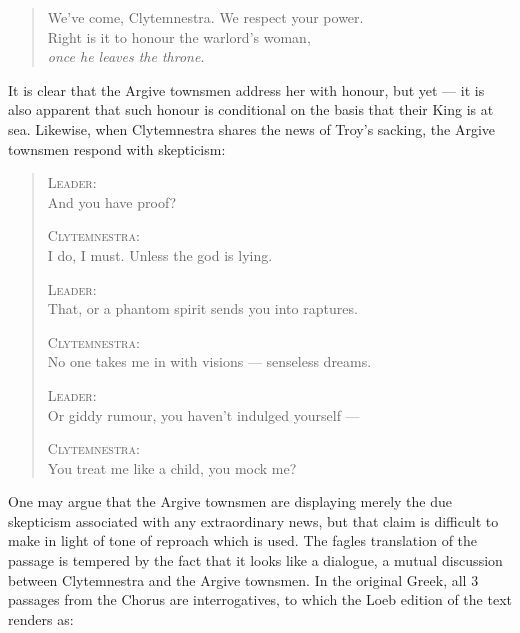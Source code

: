 \begin{quote}
    We've come, Clytemnestra. We respect your power. \\
    Right is it to honour the warlord's woman, \\
    \textit{once he leaves the throne}. \\
    \autocite[258]{fagles}
\end{quote}

\noindent
It is clear that the Argive townsmen address her with honour, but yet --- it is
also apparent that such honour is conditional on the basis that their King is
at sea. Likewise, when Clytemnestra shares the news of Troy's sacking, the
Argive townsmen respond with skepticism:

\begin{quote}
  \textsc{Leader}: \\
  And you have proof?

  \textsc{Clytemnestra}: \\
  I do, I must. Unless the god is lying.

  \textsc{Leader}: \\
  That, or a phantom spirit sends you into raptures.

  \textsc{Clytemnestra}: \\
  No one takes me in with visions --- senseless dreams.

  \textsc{Leader}: \\
  Or giddy rumour, you haven't indulged yourself ---

  \textsc{Clytemnestra}: \\
  You treat me like a child, you mock me?

  \autocite[275]{fagles}
\end{quote}

\noindent
One may argue that the Argive townsmen are displaying merely the due skepticism
associated with any extraordinary news, but that claim is difficult to make in
light of tone of reproach which is used. The fagles translation of the passage
is tempered by the fact that it looks like a dialogue, a mutual discussion
between Clytemnestra and the Argive townsmen. In the original Greek, all 3
passages from the Chorus are interrogatives, to which the Loeb edition of the
text renders as:

